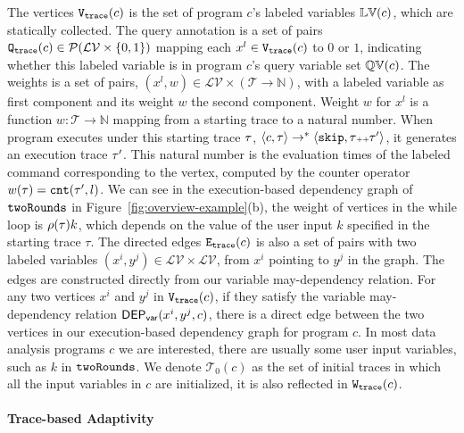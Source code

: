 The vertices $\mathtt{{V_{trace}}}(c)$ is the set of program $c$'s labeled variables $\mathbb{LV}(c)$,
which are statically collected.
The query annotation is 
a set of pairs $\mathtt{{Q_{trace}}}(c) \in \mathcal{P}(\mathcal{LV} \times \{0, 1\} )$ 
mapping each $x^l \in \mathtt{{V_{trace}}}(c)$ to $0$ or $1$, 
indicating whether this labeled variable is in program $c$'s query variable set $\mathbb{QV}(c)$.
{
The weights is a set of pairs, $(x^l, w) \in \mathcal{LV} \times (\mathcal{T} \to \mathbb{N})$,
with a labeled variable as first component and
its weight $w$ the second component.
Weight $w$ for
$x^l$ is a function $w : \mathcal{T} \to \mathbb{N}$
mapping from a starting trace to a natural number.
When program executes under this starting trace $\mathtt{\tau}$,
$\langle {c}, \mathtt{\tau} \rangle \to^{*} \langle \mathtt{skip}, \mathtt{\tau}{\scriptscriptstyle ++}\mathtt{\tau}' \rangle $, it generates an execution trace $\mathtt{\tau}'$.
This natural number is the evaluation times of the labeled command corresponding to the vertex, 
computed by the counter operator $w(\mathtt{\tau}) = \mathtt{cnt}(\mathtt{\tau}', l)$.
We can see in the execution-based dependency graph of $\mathtt{twoRounds}$ in Figure~\ref{fig:overview-example}(b), the weight of vertices in the while loop is  $\rho(\mathtt{\tau}) k$, which depends on the value of the user input $k$ specified in the starting trace $\tau$.
The directed edges $\mathtt{{E_{trace}}}({c})$ is also a set of pairs with two labeled variables $ (x^i, y^j) \in \mathcal{LV} \times \mathcal{LV}$, from $x^i$ pointing to $y^j$ in the graph.
The edges are constructed directly from our variable may-dependency relation. 
For any two vertices $x^{i}$ and $y^{j}$ in $\mathtt{{V_{trace}}}(c)$, if they satisfy the variable may-dependency relation $\mathsf{DEP_{var}}(x^i, y^j, c)$, there is a direct edge between the two vertices in our execution-based dependency graph for program $c$.
} 
In most data analysis programs $c$ we are interested, there are usually some user input variables, such as $k$ in $\mathtt{twoRounds}$. 
We denote $\mathcal{T}_0(c)$ as the set of initial traces in which all the input variables in $c$ are initialized, it is also reflected in $\mathtt{{W_{trace}}}({c})$.    

\paragraph{Trace-based Adaptivity}


